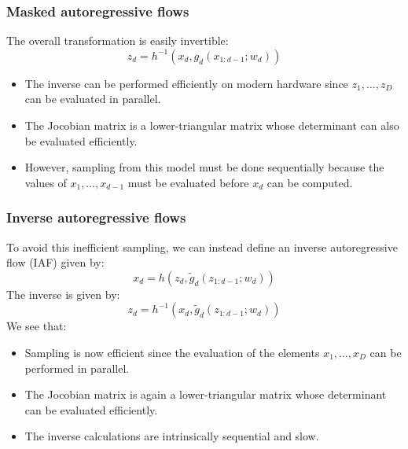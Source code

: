 \documentclass{beamer}
\begin{document}
\begin{frame}
    \frametitle{Masked autoregressive flows}
    The overall transformation is easily invertible:
    \begin{equation*}
        z_{d}=h^{-1}(x_{d},g_{d}(x_{1:d-1};w_{d}))
    \end{equation*}
    \begin{itemize}
        \item The inverse can be performed efficiently on modern hardware since $z_{1},\hdots,z_{D}$ can be evaluated in parallel.
        \item The Jocobian matrix is a lower-triangular matrix whose determinant can also be evaluated efficiently.
        \item However, sampling from this model must be done sequentially because the values of $x_{1},\hdots,x_{d-1}$ must be evaluated before $x_{d}$ can be computed.
    \end{itemize}
\end{frame}

\begin{frame}
    \frametitle{Inverse autoregressive flows}
    To avoid this inefficient sampling, we can instead define an inverse autoregressive flow (IAF) given by:
    \begin{equation*}
        x_{d}=h(z_{d},\tilde{g}_{d}(z_{1:d-1};w_d))
    \end{equation*}
    The inverse is given by:
    \begin{equation*}
        z_{d}=h^{-1}(x_{d},\tilde{g}_{d}(z_{1:d-1};w_d))
    \end{equation*}
    We see that:
    \begin{itemize}
        \item Sampling is now efficient since the evaluation of the elements $x_{1},\hdots,x_{D}$ can be performed in parallel.
        \item The Jocobian matrix is again a lower-triangular matrix whose determinant can be evaluated efficiently.
        \item The inverse calculations are intrinsically sequential and slow.
    \end{itemize}
\end{frame}
\end{document}
